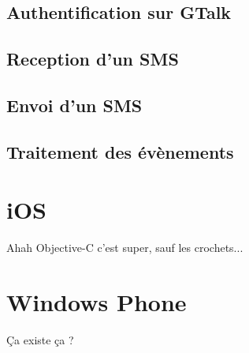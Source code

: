 \subsection{Authentification sur GTalk}
\subsection{Reception d'un SMS}
\subsection{Envoi d'un SMS}
\subsection{Traitement des évènements}




\section{iOS}

Ahah Objective-C c'est super, sauf les crochets...
\\




\section{Windows Phone}

Ça existe ça ?
\\
